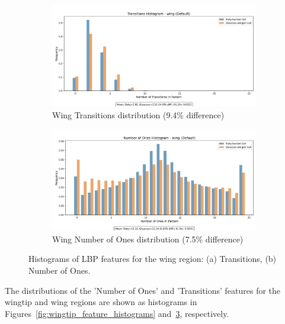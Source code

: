 \documentclass[a4paper,12pt]{report}
\begin{document}
\begin{figure}[H]
    \centering
    \begin{subfigure}[b]{0.49\textwidth}
        \includegraphics[width=\textwidth]{images/LBP/default_wing_transitions_histogram.png}
        \caption{Wing Transitions distribution (9.4\% difference)}
        \label{fig:wing_transitions}
    \end{subfigure}
    \hfill
    \begin{subfigure}[b]{0.49\textwidth}
        \includegraphics[width=\textwidth]{images/LBP/default_wing_ones_histogram.png}
        \caption{Wing Number of Ones distribution (7.5\% difference)}
        \label{fig:wing_ones}
    \end{subfigure}
    \caption{Histograms of LBP features for the wing region: (a) Transitions, (b) Number of Ones.}
    \label{fig:wing_feature_histograms}
\end{figure}

The distributions of the 'Number of Ones' and 'Transitions' features for the wingtip and wing regions are shown as histograms in Figures~\ref{fig:wingtip_feature_histograms} and~\ref{fig:wing_feature_histograms}, respectively.
\end{document}
